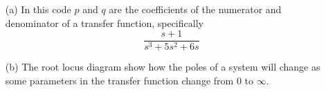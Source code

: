 \documentclass{article}
\begin{document}
\section{}
\begin{itemize}
    \item [(a)] In this code $p$ and $q$ are the coefficients of the numerator and denominator of a transfer function, specifically $$\frac{s+1}{s^3+5s^2+6s}$$
    \item [(b)] The root locus diagram show how the poles of a system will change as some parameters in the transfer function change from $0$ to $\infty$.
\end{itemize}
\end{document}
